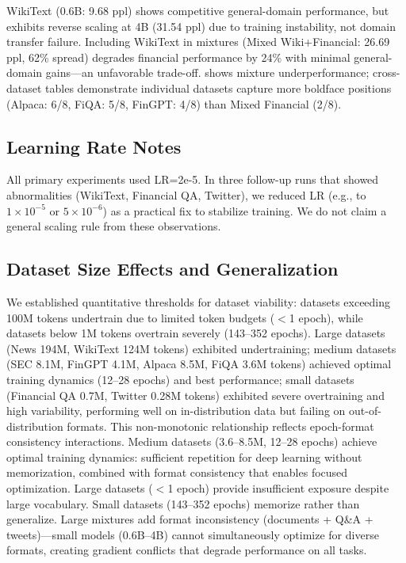 WikiText (0.6B: 9.68 ppl) shows competitive general-domain performance, but exhibits reverse scaling at 4B (31.54 ppl) due to training instability, not domain transfer failure. Including WikiText in mixtures (Mixed Wiki+Financial: 26.69 ppl, 62\% spread) degrades financial performance by 24\% with minimal general-domain gains—an unfavorable trade-off.  shows mixture underperformance; cross-dataset tables demonstrate individual datasets capture more boldface positions (Alpaca: 6/8, FiQA: 5/8, FinGPT: 4/8) than Mixed Financial (2/8).

\subsection{Learning Rate Notes}

All primary experiments used LR=2e-5. In three follow-up runs that showed abnormalities (WikiText, Financial QA, Twitter), we reduced LR (e.g., to $1\times10^{-5}$ or $5\times10^{-6}$) as a practical fix to stabilize training. We do not claim a general scaling rule from these observations.

\subsection{Dataset Size Effects and Generalization}

We established quantitative thresholds for dataset viability: datasets exceeding 100M tokens undertrain due to limited token budgets ($<$1 epoch), while datasets below 1M tokens overtrain severely (143–352 epochs). Large datasets (News 194M, WikiText 124M tokens) exhibited undertraining; medium datasets (SEC 8.1M, FinGPT 4.1M, Alpaca 8.5M, FiQA 3.6M tokens) achieved optimal training dynamics (12–28 epochs) and best performance; small datasets (Financial QA 0.7M, Twitter 0.28M tokens) exhibited severe overtraining and high variability, performing well on in-distribution data but failing on out-of-distribution formats. This non-monotonic relationship reflects epoch-format consistency interactions. Medium datasets (3.6–8.5M, 12–28 epochs) achieve optimal training dynamics: sufficient repetition for deep learning without memorization, combined with format consistency that enables focused optimization. Large datasets ($<$1 epoch) provide insufficient exposure despite large vocabulary. Small datasets (143–352 epochs) memorize rather than generalize. Large mixtures add format inconsistency (documents + Q\&A + tweets)—small models (0.6B–4B) cannot simultaneously optimize for diverse formats, creating gradient conflicts that degrade performance on all tasks.

